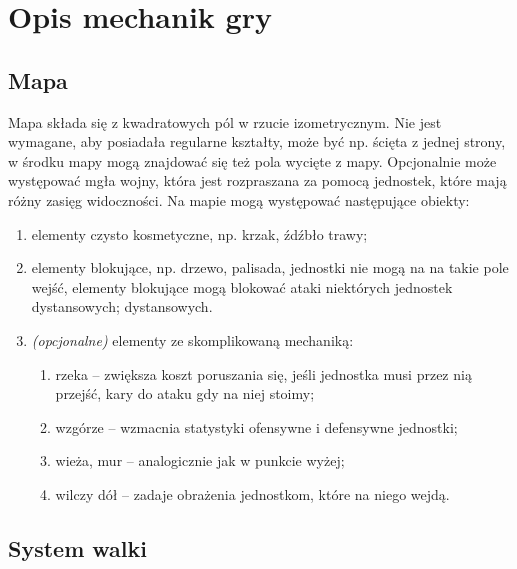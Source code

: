 \documentclass[oneside]{lmdEN}%
\begin{document}
\section{Opis mechanik gry}

\subsection{Mapa}

Mapa składa się z kwadratowych pól w rzucie izometrycznym. Nie jest wymagane, aby posiadała regularne kształty, może być np. ścięta z jednej strony, w środku mapy mogą znajdować się też pola wycięte z mapy. Opcjonalnie może występować mgła wojny, która jest rozpraszana za pomocą jednostek, które mają różny zasięg widoczności. Na mapie mogą występować następujące obiekty:

\begin{enumerate}
    \item elementy czysto kosmetyczne, np. krzak, źdźbło trawy;
    \item elementy blokujące, np. drzewo, palisada, jednostki nie mogą na na takie pole wejść, elementy blokujące mogą blokować ataki niektórych jednostek dystansowych;
dystansowych.
    \item \textit{(opcjonalne)} elementy ze skomplikowaną mechaniką:
          \begin{enumerate}
              \item rzeka – zwiększa koszt poruszania się, jeśli jednostka musi przez nią przejść, kary do ataku gdy na niej stoimy;
              \item wzgórze – wzmacnia statystyki ofensywne i defensywne jednostki;
              \item wieża, mur – analogicznie jak w punkcie wyżej;
              \item wilczy dół – zadaje obrażenia jednostkom, które na niego wejdą.
          \end{enumerate}
\end{enumerate}

\subsection{System walki}
\end{document}
